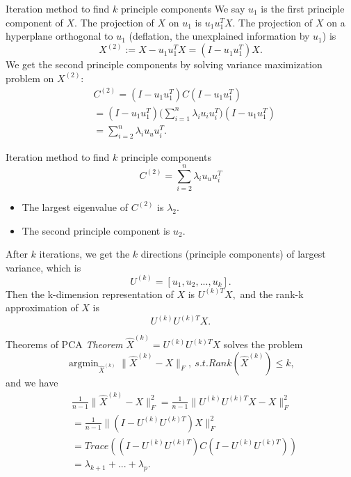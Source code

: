 \documentclass{beamer}
\begin{document}
	\begin{frame}{Iteration method to find $k$ principle components}
		We say $u_1$ is the first principle component of $X$. The projection of $X$ on $u_1$ is $u_1u_1^TX$. The projection of $X$ on a hyperplane orthogonal to $u_1$ (deflation, the unexplained information by $u_1$) is
		\[
		X^{(2)}:=X-u_1u_1^TX=(I-u_1u_1^T)X.
		\]
		We get the second principle components by solving variance maximization problem on $X^{(2)}$:
		\begin{align*}
			&C^{(2)}=(I-u_1u_1^T)C(I-u_1u_1^T) \\
			&=(I-u_1u_1^T)\big(\sum_{i=1}^{n}\lambda_iu_iu_i^T\big)(I-u_1u_1^T) \\
			&=\sum_{i=2}^{n}\lambda_iu_uu_i^T.
		\end{align*}
	\end{frame}
	
	\begin{frame}{Iteration method to find $k$ principle components}
		\[
		C^{(2)}=\sum_{i=2}^{n}\lambda_iu_uu_i^T
		\]
		\begin{itemize}
			\item The largest eigenvalue of $C^{(2)}$ is $\lambda_2$.
			\item The second principle component is $u_2$.
		\end{itemize}
		After $k$ iterations, we get the $k$ directions (principle components) of largest variance, which is
		\[
		U^{(k)}=[u_1,u_2,...,u_k].
		\]
		Then the k-dimension representation of $X$ is
		$
		U^{(k)T}X,
		$
		and the rank-k approximation of $X$ is
		\[
		U^{(k)}U^{(k)T}X.
		\]
	\end{frame}
	
	\begin{frame}{Theorems of PCA}
		\textit{Theorem} $\hat{X}^{(k)}=U^{(k)}U^{(k)T}X$ solves the problem
		\[
		\mathop{\arg\min}_{\hat{X}^{(k)}} \|\hat{X}^{(k)}-X\|_F,\ s.t. Rank(\hat{X}^{(k)})\leq k,
		\]
		and we have
		\begin{align*}
			&\frac{1}{n-1}\|\hat{X}^{(k)}-X\|_F^2=\frac{1}{n-1}\|U^{(k)}U^{(k)T}X-X\|_F^2\\
			&=\frac{1}{n-1}\|(I-U^{(k)}U^{(k)T})X\|_F^2 \\
			&=Trace((I-U^{(k)}U^{(k)T})C(I-U^{(k)}U^{(k)T})) \\
			&=\lambda_{k+1} + ... + \lambda_p.
		\end{align*}
	\end{frame}
	
\end{document}
